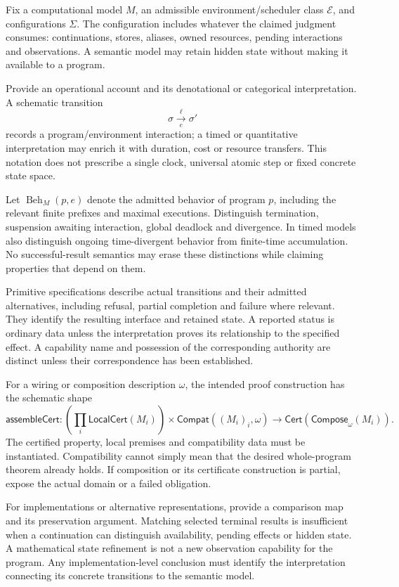 \documentclass[11pt,a4paper]{article}
\newcommand{\Beh}{\operatorname{Beh}}
\begin{document}
Fix a computational model \(M\), an admissible environment/scheduler class \(\mathcal E\), and configurations \(\Sigma\). The configuration includes whatever the claimed judgment consumes: continuations, stores, aliases, owned resources, pending interactions and observations. A semantic model may retain hidden state without making it available to a program.

Provide an operational account and its denotational or categorical interpretation. A schematic transition
\[
\sigma\xrightarrow[\ e\ ]{\ell}\sigma'
\]
records a program/environment interaction; a timed or quantitative interpretation may enrich it with duration, cost or resource transfers. This notation does not prescribe a single clock, universal atomic step or fixed concrete state space.

Let \(\Beh_M(p,e)\) denote the admitted behavior of program \(p\), including the relevant finite prefixes and maximal executions. Distinguish termination, suspension awaiting interaction, global deadlock and divergence. In timed models also distinguish ongoing time-divergent behavior from finite-time accumulation. No successful-result semantics may erase these distinctions while claiming properties that depend on them.

Primitive specifications describe actual transitions and their admitted alternatives, including refusal, partial completion and failure where relevant. They identify the resulting interface and retained state. A reported status is ordinary data unless the interpretation proves its relationship to the specified effect. A capability name and possession of the corresponding authority are distinct unless their correspondence has been established.

For a wiring or composition description \(\omega\), the intended proof construction has the schematic shape
\[
\mathsf{assembleCert}:
\left(\prod_i\mathsf{LocalCert}(M_i)\right)
\times\mathsf{Compat}((M_i)_i,\omega)
\longrightarrow
\mathsf{Cert}\!\left(\mathsf{Compose}_{\omega}(M_i)\right).
\]
The certified property, local premises and compatibility data must be instantiated. Compatibility cannot simply mean that the desired whole-program theorem already holds. If composition or its certificate construction is partial, expose the actual domain or a failed obligation.

For implementations or alternative representations, provide a comparison map and its preservation argument. Matching selected terminal results is insufficient when a continuation can distinguish availability, pending effects or hidden state. A mathematical state refinement is not a new observation capability for the program. Any implementation-level conclusion must identify the interpretation connecting its concrete transitions to the semantic model.
\end{document}
